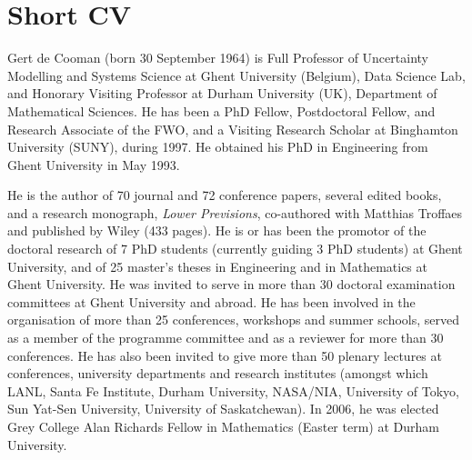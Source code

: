 \documentclass[10pt,a4paper,sans]{moderncv}
\begin{document}
\renewcommand*{\cventry}[6]{%
  \cvline{#1}{%
    {\scshape#2}%
    \ifx#3\else{, {\slshape#3}}\fi%
    \ifx#4\else{, #4}\fi%
    \ifx#5\else{, #5}\fi%
    .%
    \ifx#6\else{\newline{}\begin{minipage}[t]{\linewidth}\small#6\end{minipage}}\fi
}}%


\maketitle

\vspace{-30pt}

\section{Short CV}
\vspace{4pt}

Gert de Cooman (born 30 September 1964) is Full Professor of Uncertainty Modelling and Systems Science at Ghent University (Belgium), Data Science Lab, and Honorary Visiting Professor at Durham University (UK), Department of Mathematical Sciences. He has been a PhD Fellow, Postdoctoral Fellow, and Research Associate of the FWO, and a Visiting Research Scholar at Binghamton University (SUNY), during 1997. He obtained his PhD in Engineering from Ghent University in May 1993.

\hspace{10pt}He is the author of 70 journal and 72 conference papers, several edited books, and a research monograph, {\itshape Lower Previsions}, co-authored with Matthias Troffaes and published by Wiley (433 pages). 
He is or has been the promotor of the doctoral research of 7 PhD students (currently guiding 3 PhD students) at Ghent University, and of 25 master’s theses in Engineering and in Mathematics at Ghent University.
He was invited to serve in more than 30 doctoral examination committees at Ghent University and abroad.
He has been involved in the organisation of more than 25 conferences, workshops and summer schools, served as a member of the programme committee and as a reviewer for more than 30 conferences.
He has also been invited to give more than 50 plenary lectures at conferences, university departments and research institutes (amongst which LANL, Santa Fe Institute, Durham University, NASA/NIA, University of Tokyo, Sun Yat-Sen University, University of Saskatchewan).
In 2006, he was elected Grey College Alan Richards Fellow in Mathematics (Easter term) at Durham University.
\end{document}
